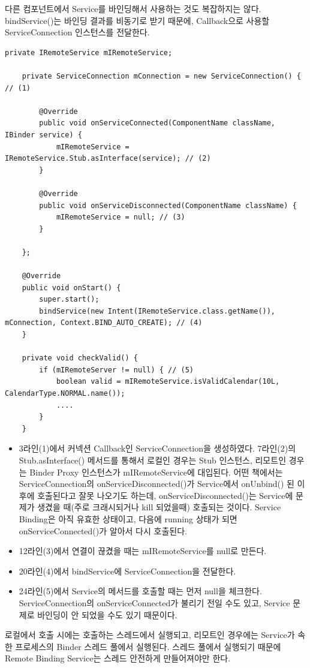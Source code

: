 다른 컴포넌트에서 Service를 바인딩해서 사용하는 것도 복잡하지는 않다. 
bindService()는 바인딩 결과를 비동기로 받기 때문에, Callback으로 사용할 ServiceConnection 인스턴스를 전달한다.
\begin{lstlisting}[frame=single]
	private IRemoteService mIRemoteService;

	private ServiceConnection mConnection = new ServiceConnection() { // (1)

		@Override
    	public void onServiceConnected(ComponentName className, IBinder service) {
        	mIRemoteService = IRemoteService.Stub.asInterface(service); // (2)
    	}

    	@Override
    	public void onServiceDisconnected(ComponentName className) {
        	mIRemoteService = null; // (3)
    	}
    	
	};

	@Override
	public void onStart() {
		super.start();
		bindService(new Intent(IRemoteService.class.getName()), mConnection, Context.BIND_AUTO_CREATE); // (4)
	}
	
	private void checkValid() {
		if (mIRemoteServer != null) { // (5)
			boolean valid = mIRemoteService.isValidCalendar(10L, CalendarType.NORMAL.name());
			....
		}	
	}
\end{lstlisting}
\begin{itemize}
\item 3라인(1)에서 커넥션 Callback인 ServiceConnection을 생성하였다. 7라인(2)의 Stub.asInterface() 메서드를 통해서 로컬인 경우는 Stub 인스턴스, 리모트인 경우는 Binder Proxy 인스턴스가 mIRemoteService에 대입된다.
어떤 책에서는 ServiceConnection의 onServiceDisconnected()가 Service에서 onUnbind() 된 이후에 호출된다고 잘못 나오기도 하는데, onServiceDisconnected()는 Service에 문제가 생겼을 때(주로 크래시되거나 kill 되었을때) 호출되는 것이다. Service Binding은 아직 유효한 상태이고, 다음에 running 상태가 되면 onServiceConnected()가 알아서 다시 호출된다.
\item 12라인(3)에서 연결이 끊겼을 때는 mIRemoteService를 null로 만든다.
\item 20라인(4)에서 bindService에 ServiceConnection을 전달한다.
\item 24라인(5)에서 Service의 메서드를 호출할 때는 먼저 null을 체크한다. ServiceConnection의 onServiceConnected가 불리기 전일 수도 있고, Service 문제로 바인딩이 안 되었을 수도 있기 때문이다.
\end{itemize}

로컬에서 호출 시에는 호출하는 스레드에서 실행되고, 리모트인 경우에는 Service가 속한 프로세스의 Binder 스레드 풀에서 실행된다. 
스레드 풀에서 실행되기 때문에 Remote Binding Service는 스레드 안전하게 만들어져야만 한다.\\

